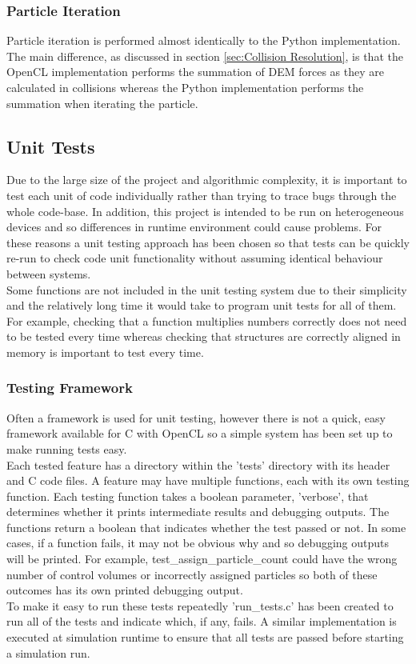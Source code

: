 \documentclass[a4paper,11pt,titlepage]{report}
\begin{document}
\subsubsection{Particle Iteration}
Particle iteration is performed almost identically to the Python implementation. The main difference, as discussed in section \ref{sec:Collision Resolution}, is that the OpenCL implementation performs the summation of DEM forces as they are calculated in collisions whereas the Python implementation performs the summation when iterating the particle.
\subsection{Unit Tests}
Due to the large size of the project and algorithmic complexity, it is important to test each unit of code individually rather than trying to trace bugs through the whole code-base. In addition, this project is intended to be run on heterogeneous devices and so differences in runtime environment could cause problems. For these reasons a unit testing approach has been chosen so that tests can be quickly re-run to check code unit functionality without assuming identical behaviour between systems.
\\Some functions are not included in the unit testing system due to their simplicity and the relatively long time it would take to program unit tests for all of them. For example, checking that a function multiplies numbers correctly does not need to be tested every time whereas checking that structures are correctly aligned in memory is important to test every time.
\subsubsection{Testing Framework}
Often a framework is used for unit testing, however there is not a quick, easy framework available for C with OpenCL so a simple system has been set up to make running tests easy.
\\Each tested feature has a directory within the 'tests' directory with its header and C code files. A feature may have multiple functions, each with its own testing function. Each testing function takes a boolean parameter, 'verbose', that determines whether it prints intermediate results and debugging outputs. The functions return a boolean that indicates whether the test passed or not. In some cases, if a function fails, it may not be obvious why and so debugging outputs will be printed. For example, test\_assign\_particle\_count could have the wrong number of control volumes or incorrectly assigned particles so both of these outcomes has its own printed debugging output. %
\\To make it easy to run these tests repeatedly 'run\_tests.c' has been created to run all of the tests and indicate which, if any, fails. A similar implementation is executed at simulation runtime to ensure that all tests are passed before starting a simulation run.
\end{document}
